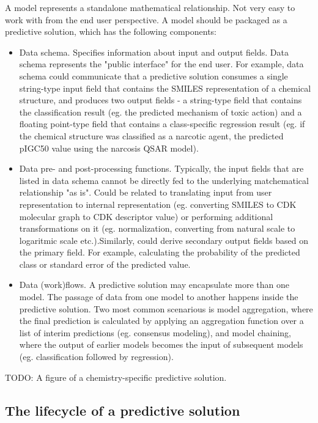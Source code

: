 \documentclass[12pt,letterpaper]{article}
\begin{document}
A model represents a standalone mathematical relationship. Not very easy
to work with from the end user perspective. A model should be packaged
as a predictive solution, which has the following components:
\begin{itemize}
  \item Data schema. Specifies information about input and output fields.
  Data schema represents the "public interface" for the end user. 
  For example, data schema could communicate that a predictive solution
  consumes a single string-type input field that contains the SMILES 
  representation of a chemical structure, and produces two output fields - 
  a string-type field that contains the classification result (eg. the 
  predicted mechanism of toxic action) and a floating point-type field 
  that contains a class-specific regression result (eg. if the chemical
  structure was classified as a narcotic agent, the predicted pIGC50 
  value using the narcosis QSAR model).
  \item Data pre- and post-processing functions. Typically, the input
  fields that are listed in data schema cannot be directly fed to the 
  underlying matchematical relationship "as is". Could be related to 
  translating input from user representation to internal representation
  (eg. converting SMILES to CDK molecular graph to CDK descriptor value)
  or performing additional transformations on it (eg. normalization, 
  converting from natural scale to logaritmic scale etc.).Similarly,
  could derive secondary output fields based on the primary field. For
  example, calculating the probability of the predicted class or standard
  error of the predicted value.
  \item Data (work)flows. A predictive solution may encapsulate more
  than one model. The passage of data from one model to another happens
  inside the predictive solution. Two most common scenarious is model 
  aggregation, where the final prediction is calculated by applying an
  aggregation function over a list of interim predictions (eg. consensus
  modeling), and model chaining, where the output of earlier models
  becomes the input of subsequent models (eg. classification followed 
  by regression).
\end{itemize}

TODO: A figure of a chemistry-specific predictive solution.

\subsection{The lifecycle of a predictive solution}
\end{document}
